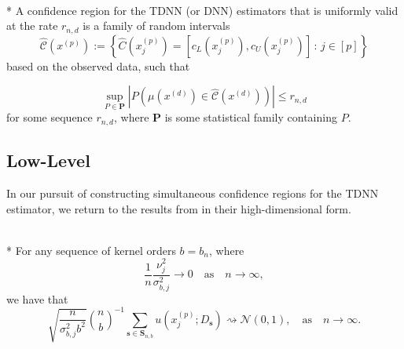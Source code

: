 \begin{boxD}
	\begin{dfn}\mbox{}\\*
		A confidence region for the TDNN (or DNN) estimators that is uniformly valid at the rate $r_{n,d}$ is a family of random intervals
		\begin{equation}
			\hat{\mathcal{C}}\left(x^{(p)}\right)
			:= \left\{\hat{C}(x^{(p)}_{j})
			= \left[c_{L}(x^{(p)}_{j}), c_{U}(x^{(p)}_{j})\right]\, : \, j \in [p]\right\}
		\end{equation}
		based on the observed data, such that
	
		\begin{equation}
			\sup_{P \in \mathbf{P}} \left| P\left(\mu(x^{(d)}) \in \hat{\mathcal{C}}\left(x^{(d)}\right)\right) \right| \leq r_{n,d}
		\end{equation}
		for some sequence $r_{n,d}$, where $\mathbf{P}$ is some statistical family containing $P$.
	\end{dfn}
\end{boxD}

\subsection{Low-Level}
In our pursuit of constructing simultaneous confidence regions for the TDNN estimator, we return to the results from \citet{ritzwoller_simultaneous_2024} in their high-dimensional form.

\begin{boxD}
	\begin{thm}\label{thm:rit4_1}\mbox{}\\*
		For any sequence of kernel orders $b=b_n$, where
		\begin{equation}
			\frac{1}{n} \frac{\nu_j^2}{\sigma_{b, j}^2} \rightarrow 0
			\quad \text{as} \quad
			n \rightarrow \infty,
		\end{equation}
		we have that
		\begin{equation}
			\sqrt{\frac{n}{\sigma_{b, j}^2 b^2}} \binom{n}{b}^{-1} \sum_{\mathbf{s} \in \mathbf{S}_{n, b}} u\left(x^{(p)}_{j} ; D_{\mathbf{s}}\right) \rightsquigarrow \mathcal{N}(0,1),
			\quad \text{as} \quad
			n \rightarrow \infty.
		\end{equation}
	\end{thm}
\end{boxD}


